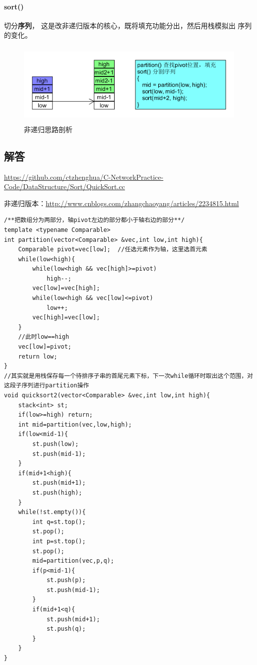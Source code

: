 \documentclass[UTF8,a4paper,12pt]{ctexbook}
\begin{document}
		\paragraph{sort()}
			切分\textbf{序列}， 这是改非递归版本的核心，既将填充功能分出，然后用栈模拟出 序列的变化。
		
		
		\begin{figure}[H]
			\centering
			\includegraphics[width=13cm,height=4cm]{quickSort}
			\caption{非递归思路剖析}
		\end{figure}
		
	\subsection{解答}
		\url{https://github.com/ctzhenghua/C-NetworkPractice-Code/DataStructure/Sort/QuickSort.cc}
		
		非递归版本：\url{http://www.cnblogs.com/zhangchaoyang/articles/2234815.html}
		
		\begin{lstlisting}
/**把数组分为两部分，轴pivot左边的部分都小于轴右边的部分**/
template <typename Comparable>
int partition(vector<Comparable> &vec,int low,int high){
    Comparable pivot=vec[low];  //任选元素作为轴，这里选首元素
    while(low<high){
        while(low<high && vec[high]>=pivot)
            high--;
        vec[low]=vec[high];
        while(low<high && vec[low]<=pivot)
            low++;
        vec[high]=vec[low];
    }
    //此时low==high
    vec[low]=pivot;
    return low;
}
//其实就是用栈保存每一个待排序子串的首尾元素下标，下一次while循环时取出这个范围，对这段子序列进行partition操作		
void quicksort2(vector<Comparable> &vec,int low,int high){
    stack<int> st;
    if(low>=high) return;
    int mid=partition(vec,low,high);
    if(low<mid-1){
        st.push(low);
        st.push(mid-1);
    }
    if(mid+1<high){
        st.push(mid+1);
        st.push(high);
    }
    while(!st.empty()){
        int q=st.top();
        st.pop();
        int p=st.top();
        st.pop();
        mid=partition(vec,p,q);
        if(p<mid-1){
            st.push(p);
            st.push(mid-1);
        }
        if(mid+1<q){
            st.push(mid+1);
            st.push(q);
        }       
    }
}		
		\end{lstlisting}
		
\end{document}

